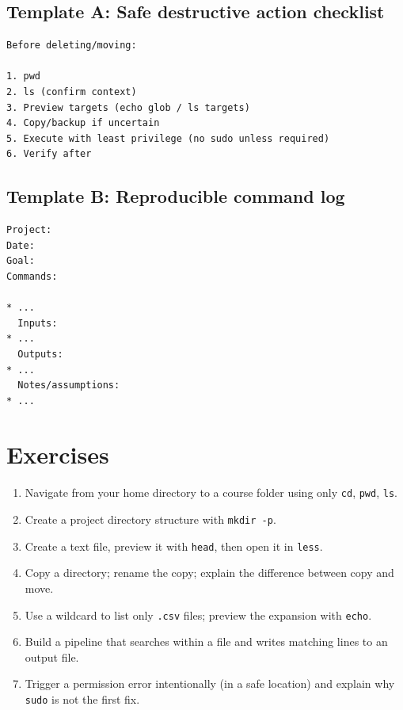 \subsection{Template A: Safe destructive action checklist}
\begin{verbatim}
Before deleting/moving:

1. pwd
2. ls (confirm context)
3. Preview targets (echo glob / ls targets)
4. Copy/backup if uncertain
5. Execute with least privilege (no sudo unless required)
6. Verify after
   \end{verbatim}

\subsection{Template B: Reproducible command log}
\begin{verbatim}
Project:
Date:
Goal:
Commands:

* ...
  Inputs:
* ...
  Outputs:
* ...
  Notes/assumptions:
* ...
  \end{verbatim}

\section{Exercises}
\begin{enumerate}
\item Navigate from your home directory to a course folder using only \texttt{cd}, \texttt{pwd}, \texttt{ls}.
\item Create a project directory structure with \texttt{mkdir -p}.
\item Create a text file, preview it with \texttt{head}, then open it in \texttt{less}.
\item Copy a directory; rename the copy; explain the difference between copy and move.
\item Use a wildcard to list only \texttt{.csv} files; preview the expansion with \texttt{echo}.
\item Build a pipeline that searches within a file and writes matching lines to an output file.
\item Trigger a permission error intentionally (in a safe location) and explain why \texttt{sudo} is not the first fix.
\end{enumerate}

